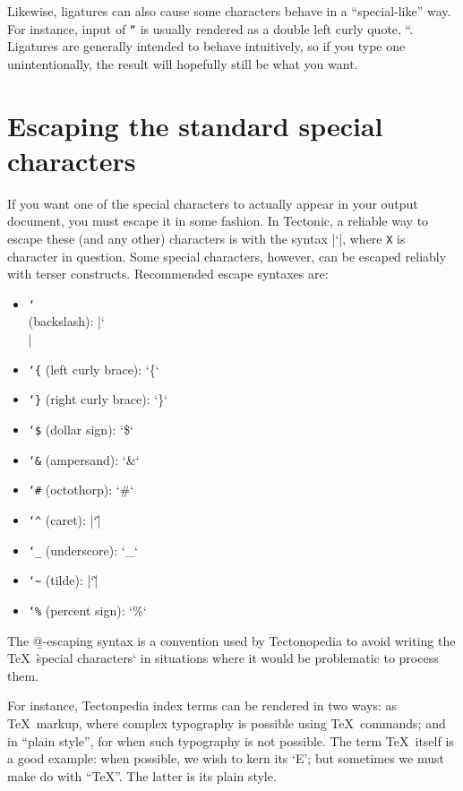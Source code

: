 Likewise, ligatures can also cause some characters behave in a “special-like”
way. For instance, input of \texttt{``} is usually rendered as a
double left curly quote, “. Ligatures are generally intended to behave
intuitively, so if you type one unintentionally, the result will hopefully still
be what you want.

\section*{Escaping the standard special characters}

If you want one of the special characters to actually appear in your output
document, you must escape it in some fashion. In Tectonic, a reliable way to
escape these (and any other) characters is with the syntax \tex|\char`\X|, where
\texttt{X} is character in question. Some special characters, however, can be
escaped reliably with terser constructs. Recommended escape syntaxes are:
\begin{itemize}
    \item \b{\texttt{\char`\\} (backslash)}: \tex|\char`\\|
    \item \b{\texttt{\char`\{} (left curly brace)}: \tex`\{`
    \item \b{\texttt{\char`\}} (right curly brace)}: \tex`\}`
    \item \b{\texttt{\char`\$} (dollar sign)}: \tex`\$`
    \item \b{\texttt{\char`\&} (ampersand)}: \tex`\&`
    \item \b{\texttt{\char`\#} (octothorp)}: \tex`\#`
    \item \b{\texttt{\char`\^} (caret)}: \tex|\char`\^|
    \item \b{\texttt{\char`\_} (underscore)}: \tex`\_`
    \item \b{\texttt{\char`\~} (tilde)}: \tex|\char`\~|
    \item \b{\texttt{\char`\%} (percent sign)}: \tex`\%`
\end{itemize}



The \b{@-escaping} syntax is a convention used by Tectonopedia to avoid writing
the \TeX\ \`special characters` in situations where it would be problematic to
process them.

For instance, Tectonpedia index terms can be rendered in two ways: as \TeX\
markup, where complex typography is possible using \TeX\ commands; and in “plain
style”, for when such typography is not possible. The term \TeX\ itself is a
good example: when possible, we wish to kern its ‘E’; but sometimes we must make
do with “TeX”. The latter is its plain style.

